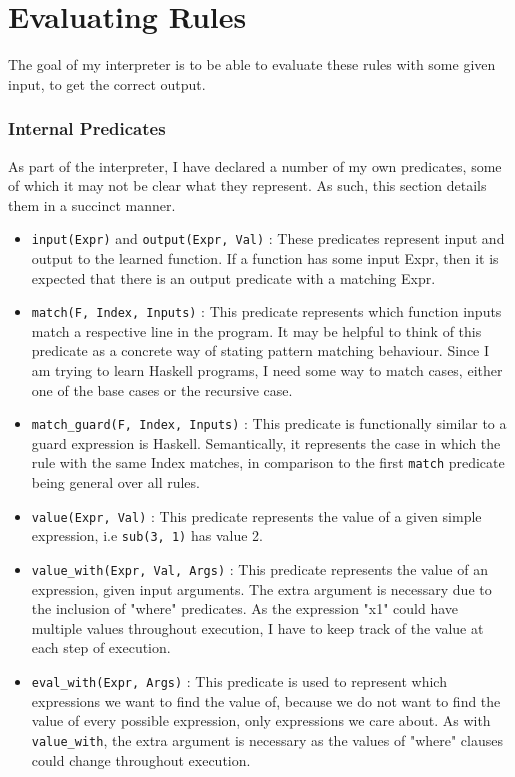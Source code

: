 \section{Evaluating Rules}

The goal of my interpreter is to be able to evaluate these rules with some given input, to get the correct output.

\subsubsection{Internal Predicates}
As part of the interpreter, I have declared a number of my own predicates, some of which it may not be clear what they represent. As such, this section details them in a succinct manner.
 
\begin{itemize}
\item \lstinline{input(Expr)} and \lstinline{output(Expr, Val)} : These predicates represent input and output to the learned function. If a function has some input Expr, then it is expected that there is an output predicate with a matching Expr.
\item \lstinline{match(F, Index, Inputs)} : This predicate represents which function inputs match a respective line in the program. It may be helpful to think of this predicate as a concrete way of stating pattern matching behaviour. Since I am trying to learn Haskell programs, I need some way to match cases, either one of the base cases or the recursive case.
\item \lstinline{match_guard(F, Index, Inputs)} : This predicate is functionally similar to a guard expression is Haskell. Semantically, it represents the case in which the rule with the same Index matches, in comparison to the first \lstinline{match} predicate being general over all rules.
\item \lstinline{value(Expr, Val)} : This predicate represents the value of a given simple expression, i.e \lstinline{sub(3, 1)} has value 2.
\item \lstinline{value_with(Expr, Val, Args)} : This predicate represents the value of an expression, given input arguments. The extra argument is necessary due to the inclusion of "where" predicates. As the expression "x1" could have multiple values throughout execution, I have to keep track of the value at each step of execution.
\item \lstinline{eval_with(Expr, Args)} : This predicate is used to represent which expressions we want to find the value of, because we do not want to find the value of every possible expression, only expressions we care about. As with \lstinline{value_with}, the extra argument is necessary as the values of "where" clauses could change throughout execution. 

\end{itemize}
